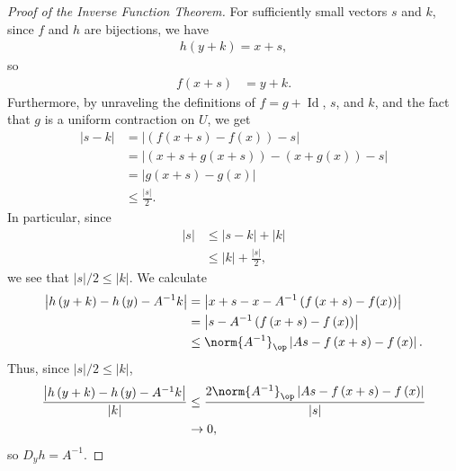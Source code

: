 \documentclass[10pt]{mypackage}
\begin{document}
\begin{proof}[Proof of the Inverse Function Theorem]
  For sufficiently small vectors $s$ and $k$, since $f$ and $h$ are bijections, we have
  \begin{align*}
    h\left( y+k \right) = x+s,
  \end{align*}
  so
  \begin{align*}
    f\left( x+s \right)  &= y+k.
  \end{align*}
  Furthermore, by unraveling the definitions of $f = g + \operatorname{Id}$, $s$, and $k$, and the fact that $g$ is a uniform contraction on $U$, we get
  \begin{align*}
    \left\vert s-k \right\vert &= \left\vert \left( f(x+s) - f(x) \right) - s \right\vert\\
                               &= \left\vert \left( x+s + g(x+s) \right) - \left( x + g(x) \right) -s\right\vert\\
                               &= \left\vert g(x+s) - g(x) \right\vert\\
                               &\leq \frac{\left\vert s \right\vert}{2}.
  \end{align*}
  In particular, since
  \begin{align*}
    \left\vert s \right\vert &\leq \left\vert s-k \right\vert + \left\vert k \right\vert\\
                             &\leq \left\vert k \right\vert + \frac{\left\vert s \right\vert}{2},
  \end{align*}
  we see that $\left\vert s \right\vert/2 \leq \left\vert k \right\vert$. We calculate
  \begin{align*}
    \left\vert h\left( y+k \right)-h\left( y \right) - A^{-1}k \right\vert &= \left\vert x+s-x-A^{-1}\left( f\left( x+s \right)-f(x) \right) \right\vert\\
                                                                           &= \left\vert s - A^{-1}\left( f\left( x+s \right)-f\left( x \right) \right) \right\vert\\
                                                                           &\leq \norm{A^{-1}}_{\op} \left\vert As - f\left( x+s \right) - f\left( x \right) \right\vert.
  \end{align*}
  Thus, since $\left\vert s \right\vert/2 \leq \left\vert k \right\vert$,
  \begin{align*}
    \frac{\left\vert h\left( y+k \right)-h\left( y \right) - A^{-1}k \right\vert}{\left\vert k \right\vert} &\leq \frac{2\norm{A^{-1}}_{\op}\left\vert As-f\left( x+s \right)-f\left( x \right) \right\vert}{\left\vert s \right\vert}\\
                                                                                                            &\rightarrow 0,
  \end{align*}
  so $D_yh = A^{-1}$.
\end{proof}
\end{document}
